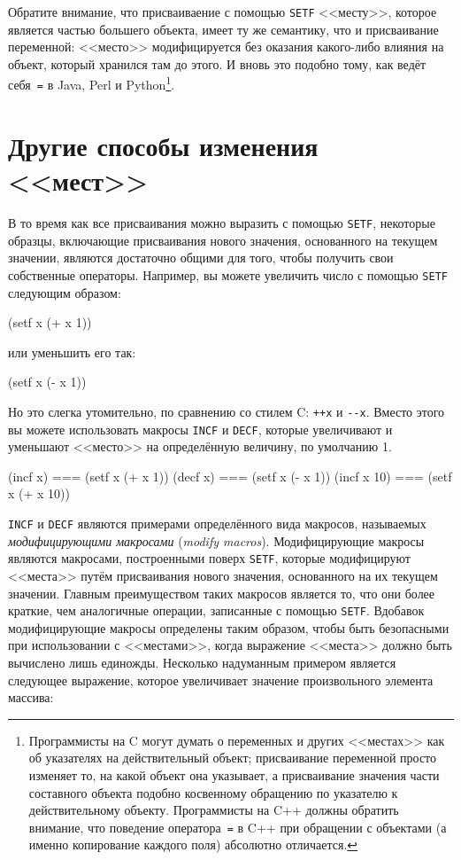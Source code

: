 Обратите внимание, что присваиваение с помощью \lstinline{SETF} <<месту>>, которое является
частью большего объекта, имеет ту же семантику, что и присваивание переменной: <<место>>
модифицируется без оказания какого-либо влияния на объект, который хранился там до
этого. И вновь это подобно тому, как ведёт себя~\lstinline{=} в Java, Perl и
Python\footnote{Программисты на C могут думать о переменных и других <<местах>> как об
  указателях на действительный объект; присваивание переменной просто изменяет
  то, на какой объект она указывает, а присваивание значения части составного объекта
  подобно косвенному обращению по указателю к действительному объекту. Программисты на C++
  должны обратить внимание, что поведение оператора~\lstinline{=} в C++ при обращении с объектами (а
  именно копирование каждого поля) абсолютно отличается.}.

\section{Другие способы изменения <<мест>>}

В то время как все присваивания можно выразить с помощью \lstinline{SETF}, некоторые образцы,
включающие присваивания нового значения, основанного на текущем значении, являются
достаточно общими для того, чтобы получить свои собственные операторы. Например, вы можете
увеличить число с помощью \lstinline{SETF} следующим образом:

\begin{myverb}
(setf x (+ x 1))
\end{myverb}

\noindent{}или уменьшить его так:

\begin{myverb}
(setf x (- x 1))
\end{myverb}

Но это слегка утомительно, по сравнению со стилем C: \lstinline{++x} и \lstinline{--x}. Вместо этого
вы можете использовать макросы \lstinline{INCF} и \lstinline{DECF}, которые увеличивают и
уменьшают <<место>> на определённую величину, по умолчанию 1.

\begin{myverb}
(incf x)    === (setf x (+ x 1))
(decf x)    === (setf x (- x 1))
(incf x 10) === (setf x (+ x 10))
\end{myverb}

\lstinline{INCF} и \lstinline{DECF} являются примерами определённого вида макросов, называемых
\textit{модифицирующими макросами} (\textit{modify macros}). Модифицирующие макросы
являются макросами, построенными поверх \lstinline{SETF}, которые модифицируют <<места>> путём
присваивания нового значения, основанного на их текущем значении. Главным преимуществом
таких макросов является то, что они более краткие, чем аналогичные операции, записанные с
помощью \lstinline{SETF}. Вдобавок модифицирующие макросы определены таким образом, чтобы
быть безопасными при использовании с <<местами>>, когда выражение <<места>> должно быть
вычислено лишь единожды. Несколько надуманным примером является следующее выражение,
которое увеличивает значение произвольного элемента массива:

